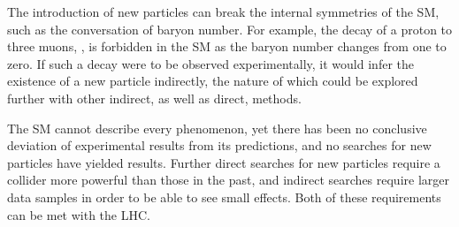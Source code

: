 The introduction of new particles can break the internal symmetries of the 
\ac{SM}, such as the conversation of baryon number.
For example, the decay of a proton to three muons, 
\decay{\Pproton}{\Pmuon\APmuon\Pmuon}, is forbidden in the \ac{SM} as the 
baryon number changes from one to zero.
If such a decay were to be observed experimentally, it would infer the 
existence of a new particle indirectly, the nature of which could be explored 
further with other indirect, as well as direct, methods.

The \ac{SM} cannot describe every phenomenon, yet there has been no conclusive 
deviation of experimental results from its predictions, and no searches for new 
particles have yielded results.
Further direct searches for new particles require a collider more powerful than 
those in the past, and indirect searches require larger data samples in order 
to be able to see small effects.
Both of these requirements can be met with the \acl{LHC}.
